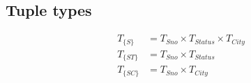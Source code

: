\documentclass{article}
\newcommand{\identifier}[1]{\ensuremath{\mathit{#1}}}
\newcommand{\ST}{\identifier{ST}}
\newcommand{\SC}{\identifier{SC}}
\newcommand{\Sno}{\identifier{Sno}}
\newcommand{\Status}{\identifier{Status}}
\newcommand{\City}{\identifier{City}}
\newcommand{\Type}[1]{\ensuremath{T_{#1}}}
\newcommand{\TT}[1]{\ensuremath{T_{\{#1\}}}}
\begin{document}


\subsection{Tuple types}
\begin{align}
    \TT{S}   &= \Type{\Sno} \times \Type{\Status} \times \Type{\City} \nonumber   \\
    \TT{\ST} &= \Type{\Sno} \times \Type{\Status} \nonumber    \\
    \TT{\SC} &= \Type{\Sno} \times \Type{\City} \nonumber
\end{align}


\end{document}
